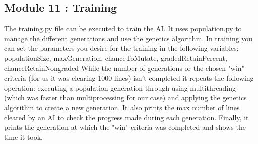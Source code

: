 \documentclass[conference]{IEEEtran}
\begin{document}
\subsection{Module 11 : Training}
The training.py file can be executed to train the AI. It uses population.py to manage the different generations and use the genetics algorithm. In training you can set the parameters you desire for the training in the following variables: populationSize, maxGeneration, chanceToMutate, gradedRetainPercent, chanceRetainNongraded
While the number of generations or the chosen "win" criteria (for us it was clearing 1000 lines) isn't completed it repeats the following operation: executing a population generation through using multithreading (which was faster than multiprocessing for our case) and applying the genetics algorithm to create a new generation. It also prints the max number of lines cleared by an AI to check the progress made during each generation.
Finally, it prints the generation at which the "win" criteria was completed and shows the time it took.
\end{document}
